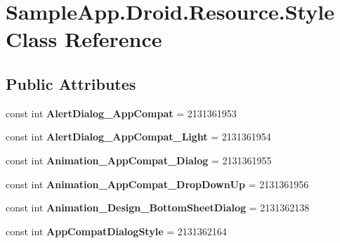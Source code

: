 \hypertarget{class_sample_app_1_1_droid_1_1_resource_1_1_style}{}\section{Sample\+App.\+Droid.\+Resource.\+Style Class Reference}
\label{class_sample_app_1_1_droid_1_1_resource_1_1_style}
\subsection*{Public Attributes}
\begin{DoxyCompactItemize}
\item 
\mbox{\label{class_sample_app_1_1_droid_1_1_resource_1_1_style_aaae1e793b037c87f86a61ab6c33257f1}} 
const int {\bfseries Alert\+Dialog\+\_\+\+App\+Compat} = 2131361953
\item 
\mbox{\label{class_sample_app_1_1_droid_1_1_resource_1_1_style_aeb5917224f357eeaaa2d38d0cb9cc231}} 
const int {\bfseries Alert\+Dialog\+\_\+\+App\+Compat\+\_\+\+Light} = 2131361954
\item 
\mbox{\label{class_sample_app_1_1_droid_1_1_resource_1_1_style_a64a9a4097afccd7c8d1711a7ac8ad648}} 
const int {\bfseries Animation\+\_\+\+App\+Compat\+\_\+\+Dialog} = 2131361955
\item 
\mbox{\label{class_sample_app_1_1_droid_1_1_resource_1_1_style_ad13cb6e9833f900948588ecc3d261bc9}} 
const int {\bfseries Animation\+\_\+\+App\+Compat\+\_\+\+Drop\+Down\+Up} = 2131361956
\item 
\mbox{\label{class_sample_app_1_1_droid_1_1_resource_1_1_style_ac066908d5d67224716f541b19df240de}} 
const int {\bfseries Animation\+\_\+\+Design\+\_\+\+Bottom\+Sheet\+Dialog} = 2131362138
\item 
\mbox{\label{class_sample_app_1_1_droid_1_1_resource_1_1_style_a18d597a687a5c7dde5644dcad7280617}} 
const int {\bfseries App\+Compat\+Dialog\+Style} = 2131362164

\end{DoxyCompactItemize}
